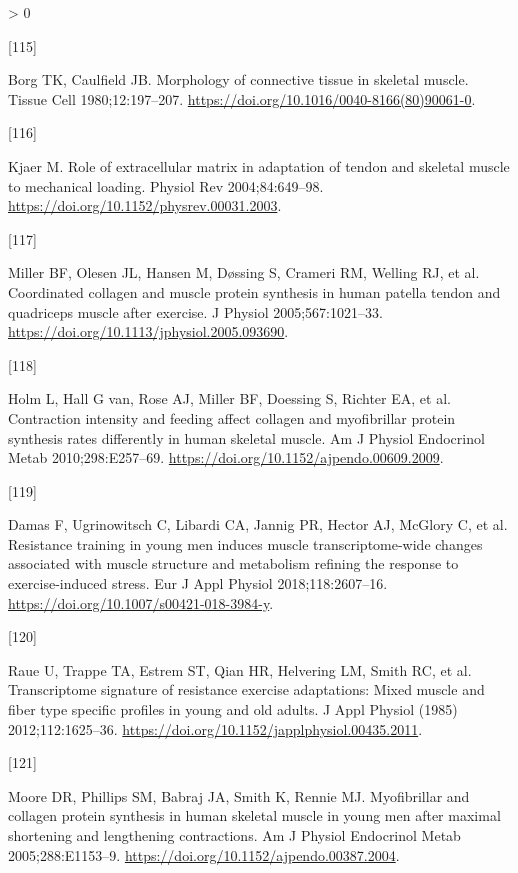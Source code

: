 \documentclass[twoside,10pt]{gihclass} %
\newlength{\cslhangindent}
\newlength{\csllabelwidth}
\newenvironment{CSLReferences}[3] %
 {%
  \setlength{\parindent}{0pt}
  \ifodd #1 \everypar{\setlength{\hangindent}{\cslhangindent}}\ignorespaces\fi
  \ifnum #2 > 0
  \setlength{\parskip}{#2\baselineskip}
  \fi
 }%
 {}
\newcommand{\CSLLeftMargin}[1]{\parbox[t]{\maxof{\widthof{#1}}{\csllabelwidth}}{#1}}
\newcommand{\CSLRightInline}[1]{\parbox[t]{\linewidth}{#1}}
\begin{document}
\begin{CSLReferences}{0}{0}
\leavevmode\hypertarget{ref-RN2783}{}%
\CSLLeftMargin{{[}115{]} }
\CSLRightInline{Borg TK, Caulfield JB. Morphology of connective tissue in skeletal muscle. Tissue Cell 1980;12:197--207. \url{https://doi.org/10.1016/0040-8166(80)90061-0}.}

\leavevmode\hypertarget{ref-RN2421}{}%
\CSLLeftMargin{{[}116{]} }
\CSLRightInline{Kjaer M. Role of extracellular matrix in adaptation of tendon and skeletal muscle to mechanical loading. Physiol Rev 2004;84:649--98. \url{https://doi.org/10.1152/physrev.00031.2003}.}

\leavevmode\hypertarget{ref-RN2788}{}%
\CSLLeftMargin{{[}117{]} }
\CSLRightInline{Miller BF, Olesen JL, Hansen M, Døssing S, Crameri RM, Welling RJ, et al. Coordinated collagen and muscle protein synthesis in human patella tendon and quadriceps muscle after exercise. J Physiol 2005;567:1021--33. \url{https://doi.org/10.1113/jphysiol.2005.093690}.}

\leavevmode\hypertarget{ref-RN2454}{}%
\CSLLeftMargin{{[}118{]} }
\CSLRightInline{Holm L, Hall G van, Rose AJ, Miller BF, Doessing S, Richter EA, et al. Contraction intensity and feeding affect collagen and myofibrillar protein synthesis rates differently in human skeletal muscle. Am J Physiol Endocrinol Metab 2010;298:E257--69. \url{https://doi.org/10.1152/ajpendo.00609.2009}.}

\leavevmode\hypertarget{ref-RN2298}{}%
\CSLLeftMargin{{[}119{]} }
\CSLRightInline{Damas F, Ugrinowitsch C, Libardi CA, Jannig PR, Hector AJ, McGlory C, et al. Resistance training in young men induces muscle transcriptome-wide changes associated with muscle structure and metabolism refining the response to exercise-induced stress. Eur J Appl Physiol 2018;118:2607--16. \url{https://doi.org/10.1007/s00421-018-3984-y}.}

\leavevmode\hypertarget{ref-RN774}{}%
\CSLLeftMargin{{[}120{]} }
\CSLRightInline{Raue U, Trappe TA, Estrem ST, Qian HR, Helvering LM, Smith RC, et al. Transcriptome signature of resistance exercise adaptations: Mixed muscle and fiber type specific profiles in young and old adults. J Appl Physiol (1985) 2012;112:1625--36. \url{https://doi.org/10.1152/japplphysiol.00435.2011}.}

\leavevmode\hypertarget{ref-RN2457}{}%
\CSLLeftMargin{{[}121{]} }
\CSLRightInline{Moore DR, Phillips SM, Babraj JA, Smith K, Rennie MJ. Myofibrillar and collagen protein synthesis in human skeletal muscle in young men after maximal shortening and lengthening contractions. Am J Physiol Endocrinol Metab 2005;288:E1153--9. \url{https://doi.org/10.1152/ajpendo.00387.2004}.}


\end{CSLReferences}
\end{document}
